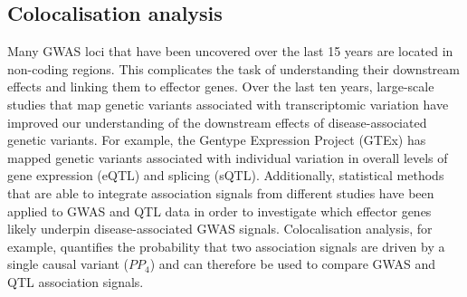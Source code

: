 \subsection{Colocalisation analysis}
Many GWAS loci that have been uncovered over the last 15 years are located in non-coding regions. This complicates the task of understanding their downstream effects and linking them to effector genes. Over the last ten years, large-scale studies that map genetic variants associated with transcriptomic variation have improved our understanding of the downstream effects of disease-associated genetic variants. For example, the Gentype Expression Project (GTEx) has mapped genetic variants associated with individual variation in overall levels of gene expression (eQTL) and splicing (sQTL). Additionally, statistical methods that are able to integrate association signals from different studies have been applied to GWAS and QTL data in order to investigate which effector genes likely underpin disease-associated GWAS signals. Colocalisation analysis, for example, quantifies the probability that two association signals are driven by a single causal variant ($PP_{4}$) and can therefore be used to compare GWAS and QTL association signals.\\

